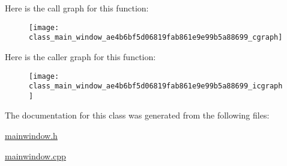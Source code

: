 Here is the call graph for this function\-:
\nopagebreak
\begin{figure}[H]
\begin{center}
\leavevmode
\texttt{[image: class\_main\_window\_ae4b6bf5d06819fab861e9e99b5a88699\_cgraph]}
\end{center}
\end{figure}




Here is the caller graph for this function\-:
\nopagebreak
\begin{figure}[H]
\begin{center}
\leavevmode
\texttt{[image: class\_main\_window\_ae4b6bf5d06819fab861e9e99b5a88699\_icgraph]}
\end{center}
\end{figure}




The documentation for this class was generated from the following files\-:\begin{DoxyCompactItemize}
\item 
\hyperlink{mainwindow_8h}{mainwindow.\-h}\item 
\hyperlink{mainwindow_8cpp}{mainwindow.\-cpp}\end{DoxyCompactItemize}
